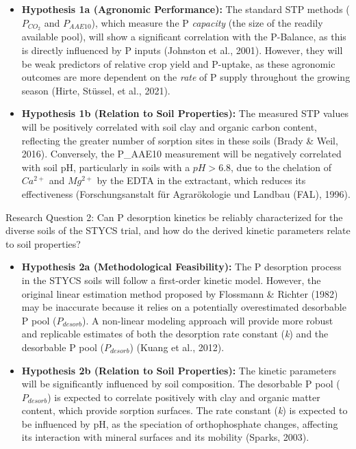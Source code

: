 \documentclass[
  a4paper,
]{article}
\begin{document}
\begin{itemize}
\item
  \textbf{Hypothesis 1a (Agronomic Performance):} The standard STP
  methods (\(P_{CO_2}\) and \(P_{AAE10}\)), which measure the P
  \emph{capacity} (the size of the readily available pool), will show a
  significant correlation with the P-Balance, as this is directly
  influenced by P inputs (Johnston et al., 2001). However, they will be
  weak predictors of relative crop yield and P-uptake, as these
  agronomic outcomes are more dependent on the \emph{rate} of P supply
  throughout the growing season (Hirte, Stüssel, et al., 2021).
\item
  \textbf{Hypothesis 1b (Relation to Soil Properties):} The measured STP
  values will be positively correlated with soil clay and organic carbon
  content, reflecting the greater number of sorption sites in these
  soils (Brady \& Weil, 2016). Conversely, the P\_AAE10 measurement will
  be negatively correlated with soil pH, particularly in soils with a
  \(pH > 6.8\), due to the chelation of \(Ca^{2+}\) and \(Mg^{2+}\) by
  the EDTA in the extractant, which reduces its effectiveness
  (Forschungsanstalt für Agrarökologie und Landbau (FAL), 1996).
\end{itemize}

Research Question 2: Can P desorption kinetics be reliably characterized
for the diverse soils of the STYCS trial, and how do the derived kinetic
parameters relate to soil properties?

\begin{itemize}
\item
  \textbf{Hypothesis 2a (Methodological Feasibility):} The P desorption
  process in the STYCS soils will follow a first-order kinetic model.
  However, the original linear estimation method proposed by Flossmann
  \& Richter (1982) may be inaccurate because it relies on a potentially
  overestimated desorbable P pool (\(P_{desorb}\)). A non-linear
  modeling approach will provide more robust and replicable estimates of
  both the desorption rate constant (\emph{k}) and the desorbable P pool
  (\(P_{desorb}\)) (Kuang et al., 2012).
\item
  \textbf{Hypothesis 2b (Relation to Soil Properties):} The kinetic
  parameters will be significantly influenced by soil composition. The
  desorbable P pool (\(P_{desorb}\)) is expected to correlate positively
  with clay and organic matter content, which provide sorption surfaces.
  The rate constant (\emph{k}) is expected to be influenced by pH, as
  the speciation of orthophosphate changes, affecting its interaction
  with mineral surfaces and its mobility (Sparks, 2003).
\end{itemize}
\end{document}
